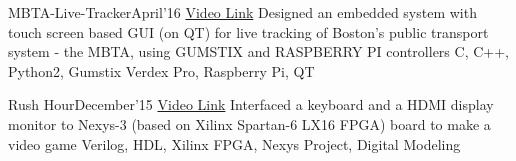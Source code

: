 \begin{projects}
				
	\project
	{MBTA-Live-Tracker}{April'16}
	{ \href{https://www.youtube.com/watch?v=DtY4qqCeVRI}{\faYoutube Video Link}}
	{Designed an embedded system with touch screen based GUI (on QT) for live tracking of Boston’s public transport system - the MBTA, using GUMSTIX and RASPBERRY PI controllers}
	{C, C++, Python2, Gumstix Verdex Pro, Raspberry Pi, QT }

	\project
	{Rush Hour}{December'15}
	{ \href{https://youtu.be/s36H25OkzVQ}{\faYoutube Video Link}}
	{Interfaced a keyboard and a HDMI display monitor to Nexys-3 (based on Xilinx Spartan-6 LX16 FPGA) board to make a video game}
	{Verilog, HDL, Xilinx FPGA, Nexys Project, Digital Modeling}
\end{projects}


